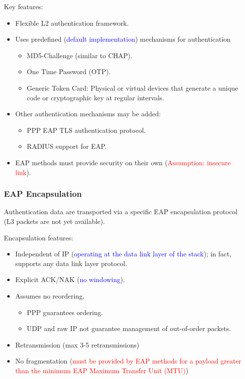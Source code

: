 Key features:
\begin{itemize}
    \item Flexible L2 authentication framework.
    \item Uses predefined (\textcolor{blue}{default implementation}) mechanisms for authentication
    \begin{itemize}
        \item MD5-Challenge (similar to CHAP).
        \item One Time Password (OTP).
        \item Generic Token Card: Physical or virtual devices that generate a unique code or cryptographic key at regular intervals.
    \end{itemize}
    \item Other authentication mechanisms may be added: 
    \begin{itemize}
        \item PPP EAP TLS authentication protocol.
        \item RADIUS support for EAP.
    \end{itemize}
    \item EAP methods must provide security on their own (\textcolor{red}{Assumption: insecure link}).
\end{itemize}

\subsubsection*{EAP Encapsulation}

Authentication data are transported via a specific EAP encapsulation protocol (L3 packets are not yet available).

Encapsulation features:
\begin{itemize}
    \item Independent of IP (\textcolor{Blue}{operating at the data link layer of the stack}); in fact, supports any data link layer protocol.
    \item Explicit ACK/NAK (\textcolor{Blue}{no windowing}).
    \item Assumes no reordering.
    \begin{itemize}
        \item PPP guarantees ordering.
        \item UDP and raw IP not guarantee management of out-of-order packets.
    \end{itemize}
    \item Retransmission (max 3-5 retransmissions)
    \item No fragmentation (\textcolor{red}{must be provided by EAP methods for a payload greater than the minimum EAP Maximum Transfer Unit (MTU)})
\end{itemize}

